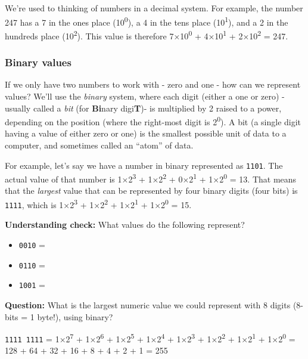 \documentclass[
]{book}
\begin{document}
We're used to thinking of numbers in a decimal system. For example, the number 247 has a 7 in the ones place (10\textsuperscript{0}), a 4 in the tens place (10\textsuperscript{1}), and a 2 in the hundreds place (10\textsuperscript{2}). This value is therefore 7×10\textsuperscript{0} + 4×10\textsuperscript{1} + 2×10\textsuperscript{2} = 247.

\hypertarget{binary-values}{%
\subsubsection{Binary values}\label{binary-values}}

If we only have two numbers to work with - zero and one - how can we represent values? We'll use the \emph{binary} system, where each digit (either a one or zero) - usually called a \emph{bit} (for \textbf{Bi}nary digi\textbf{T})- is multiplied by 2 raised to a power, depending on the position (where the right-most digit is 2\textsuperscript{0}). A bit (a single digit having a value of either zero or one) is the smallest possible unit of data to a computer, and sometimes called an ``atom'' of data.

For example, let's say we have a number in binary represented as \texttt{1101}. The actual value of that number is 1×2\textsuperscript{3} + 1×2\textsuperscript{2} + 0×2\textsuperscript{1} + 1×2\textsuperscript{0} = 13. That means that the \emph{largest} value that can be represented by four binary digits (four bits) is \texttt{1111}, which is 1×2\textsuperscript{3} + 1×2\textsuperscript{2} + 1×2\textsuperscript{1} + 1×2\textsuperscript{0} = 15.

\textbf{Understanding check:} What values do the following represent?

\begin{itemize}
\item
  \texttt{0010} =
\item
  \texttt{0110} =
\item
  \texttt{1001} =
\end{itemize}

\textbf{Question:} What is the largest numeric value we could represent with 8 digits (8-bits = 1 byte!), using binary?

\texttt{1111\ 1111} = 1×2\textsuperscript{7} + 1×2\textsuperscript{6} + 1×2\textsuperscript{5} + 1×2\textsuperscript{4} + 1×2\textsuperscript{3} + 1×2\textsuperscript{2} + 1×2\textsuperscript{1} + 1×2\textsuperscript{0} = 128 + 64 + 32 + 16 + 8 + 4 + 2 + 1 = 255
\end{document}
